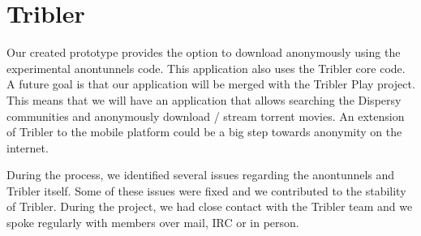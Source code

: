\section{Tribler}
	Our created prototype provides the option to download anonymously using the experimental anontunnels code. This application also uses the Tribler core code. A future goal is that our application will be merged with the Tribler Play project. This means that we will have an application that allows searching the Dispersy communities and anonymously download / stream torrent movies. An extension of Tribler to the mobile platform could be a big step towards anonymity on the internet.
	
	During the process, we identified several issues regarding the anontunnels and Tribler itself. Some of these issues were fixed and we contributed to the stability of Tribler. During the project, we had close contact with the Tribler team and we spoke regularly with members over mail, IRC or in person.